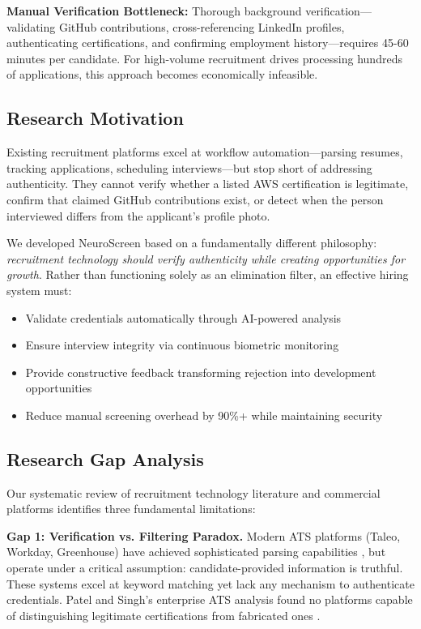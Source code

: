 \documentclass[conference]{IEEEtran}
\begin{document}
\textbf{Manual Verification Bottleneck:} Thorough background verification—validating GitHub contributions, cross-referencing LinkedIn profiles, authenticating certifications, and confirming employment history—requires 45-60 minutes per candidate. For high-volume recruitment drives processing hundreds of applications, this approach becomes economically infeasible.

\subsection{Research Motivation}

Existing recruitment platforms excel at workflow automation—parsing resumes, tracking applications, scheduling interviews—but stop short of addressing authenticity. They cannot verify whether a listed AWS certification is legitimate, confirm that claimed GitHub contributions exist, or detect when the person interviewed differs from the applicant's profile photo.

We developed NeuroScreen based on a fundamentally different philosophy: \textit{recruitment technology should verify authenticity while creating opportunities for growth}. Rather than functioning solely as an elimination filter, an effective hiring system must:

\begin{itemize}
    \item Validate credentials automatically through AI-powered analysis
    \item Ensure interview integrity via continuous biometric monitoring
    \item Provide constructive feedback transforming rejection into development opportunities
    \item Reduce manual screening overhead by 90\%+ while maintaining security
\end{itemize}

\subsection{Research Gap Analysis}

Our systematic review of recruitment technology literature and commercial platforms identifies three fundamental limitations:

\textbf{Gap 1: Verification vs. Filtering Paradox.} Modern ATS platforms (Taleo, Workday, Greenhouse) have achieved sophisticated parsing capabilities \cite{patel2022enhancing}, but operate under a critical assumption: candidate-provided information is truthful. These systems excel at keyword matching yet lack any mechanism to authenticate credentials. Patel and Singh's enterprise ATS analysis found no platforms capable of distinguishing legitimate certifications from fabricated ones \cite{patel2022enhancing}.
\end{document}
